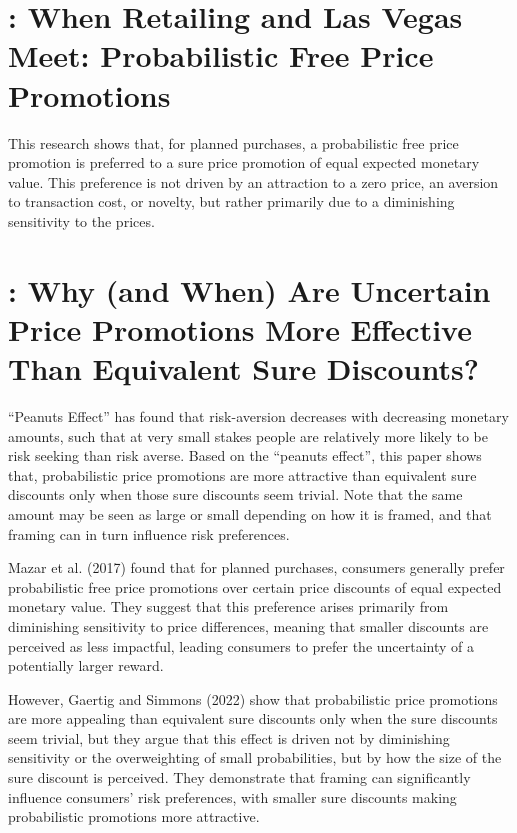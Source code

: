 \documentclass[11pt]{elegantbook}
\begin{document}
\section{\cite{mazar2017retailing}: When Retailing and Las Vegas Meet: Probabilistic Free Price Promotions}
This research shows that, for planned purchases, a probabilistic free price promotion is preferred to a sure price promotion of equal expected monetary value.  This preference is not driven by an attraction to a zero price, an aversion to transaction cost, or novelty, but rather primarily due to a diminishing sensitivity to the prices.


\section{\cite{gaertig2018and}: Why (and When) Are Uncertain Price Promotions More Effective Than Equivalent Sure Discounts?}
“Peanuts Effect” has found that risk-aversion decreases with decreasing monetary amounts, such that at very small stakes people are relatively more likely to be risk seeking than risk averse. Based on the ``peanuts effect'', this paper shows that, probabilistic price promotions are more attractive than equivalent sure discounts only when those sure discounts seem trivial. Note that the same amount may be seen as large or small depending on how it is framed, and that framing can in turn influence risk preferences.


Mazar et al. (2017) found that for planned purchases, consumers generally prefer probabilistic free price promotions over certain price discounts of equal expected monetary value. They suggest that this preference arises primarily from diminishing sensitivity to price differences, meaning that smaller discounts are perceived as less impactful, leading consumers to prefer the uncertainty of a potentially larger reward.

However, Gaertig and Simmons (2022) show that probabilistic price promotions are more appealing than equivalent sure discounts only when the sure discounts seem trivial, but they argue that this effect is driven not by diminishing sensitivity or the overweighting of small probabilities, but by how the size of the sure discount is perceived. They demonstrate that framing can significantly influence consumers' risk preferences, with smaller sure discounts making probabilistic promotions more attractive.
\end{document}
